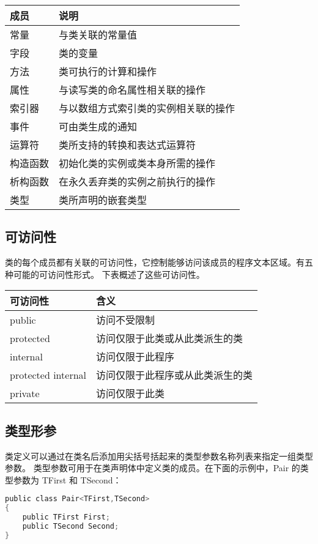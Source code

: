 \begin{tabular}{|l|l|}
\hline
成员 &  说明   \\
\hline
常量   &         与类关联的常量值 \\
字段   &         类的变量 \\
方法   &         类可执行的计算和操作 \\
属性   &         与读写类的命名属性相关联的操作 \\
索引器  &      与以数组方式索引类的实例相关联的操作 \\
事件   &         可由类生成的通知 \\
运算符  &      类所支持的转换和表达式运算符 \\
构造函数 &   初始化类的实例或类本身所需的操作 \\
析构函数 &   在永久丢弃类的实例之前执行的操作 \\
类型   &         类所声明的嵌套类型 \\
\hline
\end{tabular}

\subsection{可访问性}
类的每个成员都有关联的可访问性，它控制能够访问该成员的程序文本区域。有五种可能的可访问性形式。
下表概述了这些可访问性。

\begin{tabular}{|l|l|}
\hline
可访问性  &   含义  \\
\hline
public        &  访问不受限制   \\
protected  &  访问仅限于此类或从此类派生的类  \\
internal    & 访问仅限于此程序  \\
protected internal  & 访问仅限于此程序或从此类派生的类  \\
private & 访问仅限于此类  \\
\hline
\end{tabular}

\subsection{ 类型形参}

类定义可以通过在类名后添加用尖括号括起来的类型参数名称列表来指定一组类型参数。
类型参数可用于在类声明体中定义类的成员。在下面的示例中，Pair 的类型参数为 TFirst 和 TSecond：

 \begin{lstlisting}[language=C]
public class Pair<TFirst,TSecond>
{
    public TFirst First;
    public TSecond Second;
}
 \end{lstlisting}

